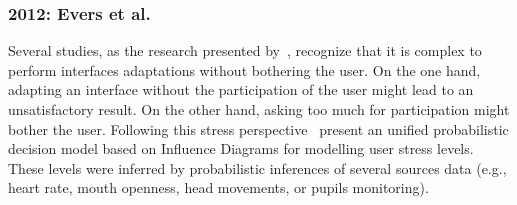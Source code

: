 
\subsubsection{2012: Evers et al.}
\label{sec:evers}

Several studies, as the research presented by~\citet{evers_achieving_2012},
recognize that it is complex to perform interfaces adaptations without bothering
the user. On the one hand, adapting an interface without the participation of the
user might lead to an unsatisfactory result. On the other hand, asking too much
for participation might bother the user. 
Following this stress perspective~\citet{liao_decision_2005} present an unified 
probabilistic decision model based on Influence Diagrams for modelling user stress 
levels. These levels were inferred by probabilistic inferences of several sources 
data (e.g., heart rate, mouth openness, head movements, or pupils monitoring).
